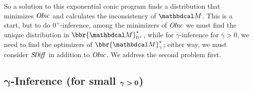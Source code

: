 \documentclass{article}
\newcommand\zogamma{{\bar\gamma}}
\begin{document}
So a solution to this exponential conic program 
finds a distribution that minimizes $\mathit{O\mskip-2.5muI\mskip-3.5mun\mskip-1.7muc}$ and calculates the inconsistency
of $\dg M$.
This is a start, but to do 
$0^+$-inference,
among the minimizers of $\mathit{O\mskip-2.5muI\mskip-3.5mun\mskip-1.7muc}$
we must find the unique distribution in $\bbr{\dg M}^*_{0^+}$, 
while for $\zogamma$-inference for $\zogamma > 0$, we need to find the optimizers of
$\bbr{\dg M}^*_\gamma$;
either way, we must consider 
$\mathit{S\mskip-3.5muD\mskip-2.5mui\mskip-1.5muff}$
in addition to $\mathit{O\mskip-2.5muI\mskip-3.5mun\mskip-1.7muc}$. 
We address the second problem first.

\subsection{%
    \texorpdfstring{$\boldsymbol\gamma$}{gamma}-Inference
    (for small \texorpdfstring{$\boldsymbol\gamma\boldsymbol>\mathbf{0}$}{gamma})%
} \label{sec:small-gamma}
\end{document}

